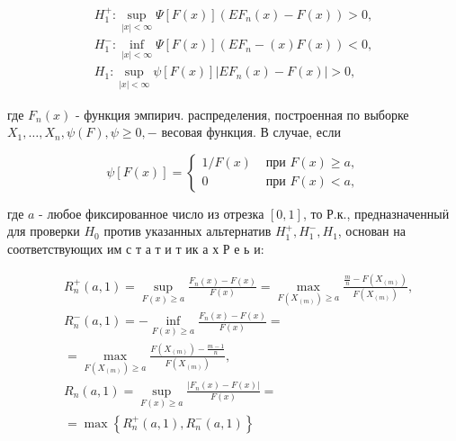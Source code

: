 \documentclass[10pt]{article}
\begin{document}
\[

\begin{gathered}

H_{1}^{+}: \sup _{|x|<\infty} \Psi[F(x)]\left(E F_{n}(x)-F(x)\right)>0, \\

H_{1}^{-}: \inf _{|x|<\infty} \Psi[F(x)]\left(E F_{n}-(x) F(x)\right)<0, \\

H_{1}: \sup _{|x|<\infty} \psi[F(x)]\left|E F_{n}(x)-F(x)\right|>0,

\end{gathered}

\]



где $F_{n}(x)$ - функция эмпирич. распределения, построенная по выборке $X_{1}, \ldots, X_{n}, \psi(F), \psi \geqslant 0,-$ весовая функция. В случае, если



\[

\psi[F(x)]=\left\{\begin{array}{cl}

1 / F(x) & \text { при } F(x) \geqslant a, \\

0 & \text { при } F(x)<a,

\end{array}\right.

\]



где $a$ - любое фиксированное число из отрезка $[0,1]$, то Р.к., предназначенныӥ для проверки $H_{0}$ против указанных альтернатив $H_{1}^{+}, H_{1}^{-}, H_{1}$, основан на соответствующих им с т а т и т ик а х Р е ь и:



\[

\begin{aligned}

& R_{n}^{+}(a, 1)=\sup _{F(x) \geqslant a} \frac{F_{n}(x)-F(x)}{F(x)}=\max _{F\left(X_{(m)}\right) \geqslant a} \frac{\frac{m}{n}-F\left(X_{(m)}\right)}{F\left(X_{(m)}\right)}, \\

& R_{n}^{-}(a, 1)=-\inf _{F(x) \geqslant a} \frac{F_{n}(x)-F(x)}{F(x)}= \\

& =\max _{F\left(X_{(m)}\right) \geqslant a} \frac{F\left(X_{(m)}\right)-\frac{m-1}{n}}{F\left(X_{(m)}\right)}, \\

& R_{n}(a, 1)=\sup _{F(x) \geqslant a} \frac{\left|F_{n}(x)-F(x)\right|}{F(x)}= \\

& =\max \left\{R_{n}^{+}(a, 1), R_{n}^{-}(a, 1)\right\}

\end{aligned}

\]
\end{document}
